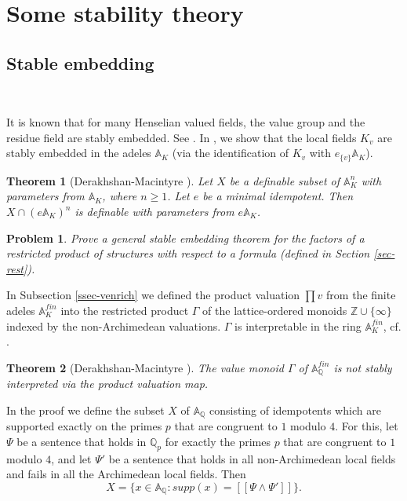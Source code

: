 \documentclass[12pt]{amsart}
\def\A{\mathbb{A}}
\def\Z{\mathbb{Z}}
\def\Q{\mathbb{Q}}
\newtheorem{thm}{Theorem}[section]
\numberwithin{equation}{section}
\newtheorem{prob}{Problem}[section]
\begin{document}
\section{\bf Some stability theory}\label{sec-stab}

\medskip

\subsection{\bf Stable embedding}\label{ssec-stemb} 

\

\medskip

It is known that for many Henselian valued fields, the value group and the residue field are stably embedded. See \cite{HHM}. In \cite{DM-supp}, we show that the local fields $K_v$ are stably embedded in the adeles $\A_K$ (via the identification of 
$K_v$ with $e_{\{v\}}\A_K$). 
\begin{thm}[Derakhshan-Macintyre {\cite{DM-supp}}] Let $X$ be a definable subset of $\A_K^n$ with parameters from $\A_K$, where $n\geq 1$. 
Let $e$ be a minimal idempotent. 
Then $X\cap (e\A_K)^n$ is definable with parameters from $e\A_K$.
\end{thm}

\begin{prob}\cite{DM-supp} Prove a general stable embedding theorem for the factors of a restricted product of structures with respect to a formula (defined in Section \ref{sec-rest}).\end{prob}

In Subsection \ref{ssec-venrich} we defined the product valuation $\prod v$ from the finite adeles $\A_K^{fin}$ into the 
restricted product $\Gamma$ of the lattice-ordered monoids $\Z\cup\{\infty\}$ indexed by the non-Archimedean valuations.
$\Gamma$ is interpretable in the ring $\A_K^{fin}$, cf. \cite{DM-supp}.

\begin{thm} [Derakhshan-Macintyre {\cite{DM-supp}}]The value monoid $\Gamma$ of $\A_{\Q}^{fin}$ is not stably interpreted via the product valuation map.
\end{thm}
In the proof we define the subset $X$ of $\A_{\Q}$ consisting of 
idempotents which are supported exactly on the primes 
$p$ that are congruent to $1$ modulo $4$. For this, let $\Psi$ be a sentence that holds in $\Q_p$ for exactly 
the primes $p$ that are congruent to $1$ modulo $4$, and let $\Psi'$ be a sentence that holds in all 
non-Archimedean local fields and fails in all the Archimedean local fields. Then 
$$X=\{x\in \A_{\Q}: supp(x)=[[\Psi \wedge \Psi']]\}.$$
\end{document}

